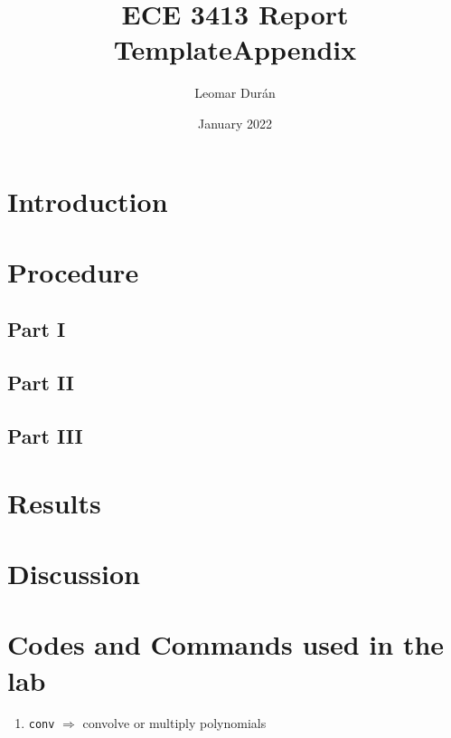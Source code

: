 \documentclass[11pt]{article}
\begin{document}
\title{ECE 3413 Report Template}
\author{Leomar Dur\'an}
\date{January 2022}

\maketitle

\section{Introduction}

\section{Procedure}

\begin{adjustwidth}{0.5in}{0.5in}
    \subsection{Part I}
    \subsection{Part II}
    \subsection{Part III}
\end{adjustwidth}

\section{Results}
\section{Discussion}

\newpage
\appendix
\title{Appendix}\label{doc:apx}
\maketitle

\section{Codes and Commands used in the lab}

\begin{enumerate}
    \item
        \texttt{conv}
        \tabto{1.5in}
        \(\Rightarrow\) convolve or multiply polynomials
\end{enumerate}
\end{document}
